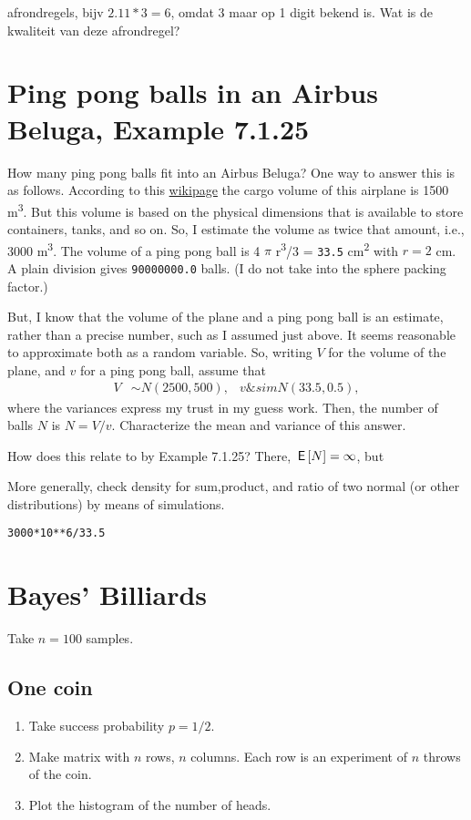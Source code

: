 \documentclass[a4paper]{article}
\begin{document}
afrondregels, bijv \(2.11*3= 6\), omdat \(3\) maar op 1 digit bekend is. Wat is de kwaliteit van deze afrondregel?

\section{Ping pong balls in an Airbus Beluga, Example 7.1.25}
\label{sec:org08202e8}

How many ping pong balls fit into an Airbus Beluga? One way to answer this is as follows. According to this \href{https://en.wikipedia.org/wiki/Airbus\_Beluga}{wikipage} the cargo volume of this airplane is 1500 m\textsuperscript{3}. But this volume is based on the physical dimensions that is available to store containers, tanks, and so on. So, I estimate the volume as twice that amount, i.e., 3000 m\textsuperscript{3}. The volume of a ping pong ball is 4  \(\pi\) r\textsuperscript{3}/3 = \texttt{33.5} cm\textsuperscript{2} with \(r=2\) cm.  A plain division gives
\texttt{90000000.0}  balls. (I do not take into the sphere packing factor.)

But, I know that the volume of the plane and a ping pong ball is an estimate, rather than a precise number, such as I assumed just above. It seems reasonable to approximate both as a random variable. So, writing \(V\) for the volume of the plane, and \(v\) for a ping pong ball, assume that
   \begin{align*}
V &\sim N(2500, 500), & v\&sim N(33.5, 0.5),
\end{align*}
where the variances express my trust in my guess work. Then, the number of balls \(N\) is \(N = V/v\). 
Characterize the mean and variance of this answer.

How does this relate to by Example 7.1.25? There, \(\,\mathsf{E}\left[N\right] = \infty\), but 

More generally,  check density for sum,product, and ratio of two normal (or other distributions)  by means of simulations.

\begin{verbatim}
3000*10**6/33.5
\end{verbatim}


\section{Bayes' Billiards}
\label{sec:orgf93559e}
Take \(n=100\) samples. 

\subsection{One coin}
\label{sec:org1e9a031}
\begin{enumerate}
\item Take success probability \(p=1/2\).
\item Make matrix with \(n\) rows, \(n\) columns. Each row is an experiment of \(n\) throws of the coin.
\item Plot the histogram of the number of heads.
\end{enumerate}
\end{document}
